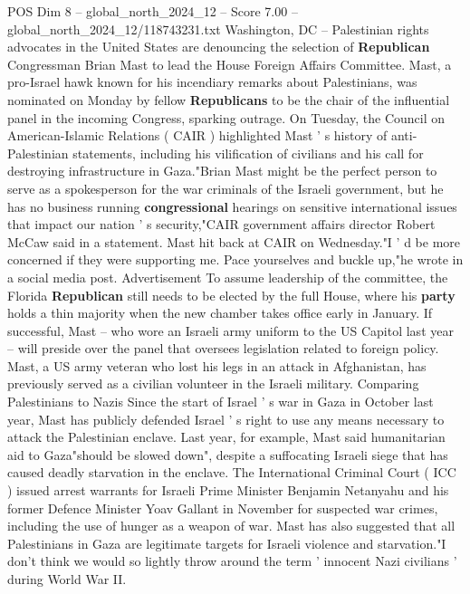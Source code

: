 \begin{textsample}{POS Dim 8 – global\_north\_2024\_12 – Score 7.00 – global\_north\_2024\_12/118743231.txt}  \label{ex:f8_pos_343}
Washington, DC -- Palestinian rights advocates in the United States are denouncing the selection of \textbf{Republican} Congressman Brian Mast to lead the House Foreign Affairs Committee.
Mast, a pro-Israel hawk known for his incendiary remarks about Palestinians, was nominated on Monday by fellow \textbf{Republicans} to be the chair of the influential panel in the incoming Congress, sparking outrage.
On Tuesday, the Council on American-Islamic Relations ( CAIR ) highlighted Mast ' s history of anti-Palestinian statements, including his vilification of civilians and his call for destroying infrastructure in Gaza."Brian Mast might be the perfect person to serve as a spokesperson for the war criminals of the Israeli government, but he has no business running \textbf{congressional} hearings on sensitive international issues that impact our nation ' s security,"CAIR government affairs director Robert McCaw said in a statement.
Mast hit back at CAIR on Wednesday."I ' d be more concerned if they were supporting me.
Pace yourselves and buckle up,"he wrote in a social media post.
Advertisement To assume leadership of the committee, the Florida \textbf{Republican} still needs to be elected by the full House, where his \textbf{party} holds a thin majority when the new chamber takes office early in January.
If successful, Mast -- who wore an Israeli army uniform to the US Capitol last year -- will preside over the panel that oversees legislation related to foreign policy.
Mast, a US army veteran who lost his legs in an attack in Afghanistan, has previously served as a civilian volunteer in the Israeli military.
Comparing Palestinians to Nazis Since the start of Israel ' s war in Gaza in October last year, Mast has publicly defended Israel ' s right to use any means necessary to attack the Palestinian enclave.
Last year, for example, Mast said humanitarian aid to Gaza"should be slowed down", despite a suffocating Israeli siege that has caused deadly starvation in the enclave.
The International Criminal Court ( ICC ) issued arrest warrants for Israeli Prime Minister Benjamin Netanyahu and his former Defence Minister Yoav Gallant in November for suspected war crimes, including the use of hunger as a weapon of war.
Mast has also suggested that all Palestinians in Gaza are legitimate targets for Israeli violence and starvation."I don't think we would so lightly throw around the term ' innocent Nazi civilians ' during World War II.

\end{textsample}

